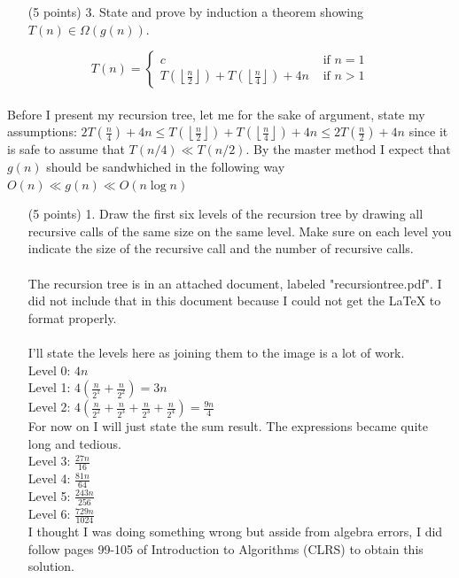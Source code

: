 \documentclass[paper=a4,fontsize=11pt]{article}
\begin{document}
\begin{enumerate}
\begin{enumerate}
\item [(5 points) 3.] State and prove by induction a theorem showing $T (n) \in \Omega(g(n))$.
\end{enumerate}
\[
T(n) = \left\{
\begin{array}{cl}
c & \textrm{ if } n = 1\\
T(\left\lfloor\frac{n}{2}\right\rfloor) + T(\left\lfloor\frac{n}{4}\right\rfloor) + 4n & \textrm{ if } n > 1
\end{array}
\right.
\]
\\Before I present my recursion tree, let me for the sake of argument, state my assumptions: $2T(\frac{n}{4})+4n \leq T(\left\lfloor\frac{n}{2}\right\rfloor) + T(\left\lfloor\frac{n}{4}\right\rfloor) + 4n \leq 2T(\frac{n}{2})+4n$ since it is safe to assume that $T(n/4) \ll T(n/2)$. By the master method I expect that $g(n)$ should be sandwhiched in the following way $O(n) \ll g(n) \ll O(n\log{n})$\\
\begin{enumerate}
\item [(5 points) 1.] Draw the first six levels of the recursion tree by drawing all recursive calls of the same size on the same level. Make sure on each level you indicate the size of the recursive call and the number of recursive calls. \\\\
The recursion tree is in an attached document, labeled "recursiontree.pdf". I did not include that in this document because I could not get the LaTeX to format properly.\\\\
I'll state the levels here as joining them to the image is a lot of work.\\
Level 0: $4n$\\
Level 1: $4(\frac{n}{2^1}+\frac{n}{2^2})=3n$\\
Level 2: $4(\frac{n}{2^2}+\frac{n}{2^3}+\frac{n}{2^3}+\frac{n}{2^4})=\frac{9n}{4}$\\
For now on I will just state the sum result. The expressions became quite long and tedious.\\
Level 3: $\frac{27n}{16}$\\
Level 4: $\frac{81n}{64}$\\
Level 5: $\frac{243n}{256}$\\
Level 6: $\frac{729n}{1024}$\\
I thought I was doing something wrong but asside from algebra errors, I did follow pages 99-105 of Introduction to Algorithms (CLRS) to obtain this solution.\\\\

\end{enumerate}
\end{enumerate}
\end{document}
